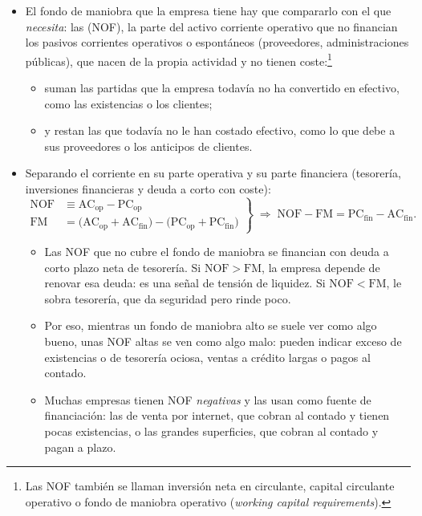 \documentclass[11pt]{article}
\begin{document}
\begin{itemize}
\item El fondo de maniobra que la empresa tiene hay que compararlo con el que \emph{necesita}: las  (NOF), la parte del activo corriente operativo que no financian los pasivos corrientes operativos o espontáneos (proveedores, administraciones públicas), que nacen de la propia actividad y no tienen coste:\footnote{Las NOF también se llaman inversión neta en circulante, capital circulante operativo o fondo de maniobra operativo (\emph{working capital requirements}).}
  \begin{itemize}
  \item suman las partidas que la empresa todavía no ha convertido en efectivo, como las existencias o los clientes;
  \item y restan las que todavía no le han costado efectivo, como lo que debe a sus proveedores o los anticipos de clientes.
  \end{itemize}
\item Separando el corriente en su parte operativa y su parte financiera (tesorería, inversiones financieras y deuda a corto con coste):
  \[
  \left.\begin{aligned}
  \mathrm{NOF}&\equiv\mathrm{AC}_{\mathrm{op}}-\mathrm{PC}_{\mathrm{op}}\\
  \mathrm{FM}&=\big(\mathrm{AC}_{\mathrm{op}}+\mathrm{AC}_{\mathrm{fin}}\big)-\big(\mathrm{PC}_{\mathrm{op}}+\mathrm{PC}_{\mathrm{fin}}\big)
  \end{aligned}\right\}
  \;\Longrightarrow\;
  \mathrm{NOF}-\mathrm{FM}=\mathrm{PC}_{\mathrm{fin}}-\mathrm{AC}_{\mathrm{fin}}.
  \]
  \begin{itemize}
  \item Las NOF que no cubre el fondo de maniobra se financian con deuda a corto plazo neta de tesorería. Si $\mathrm{NOF}>\mathrm{FM}$, la empresa depende de renovar esa deuda: es una señal de tensión de liquidez. Si $\mathrm{NOF}<\mathrm{FM}$, le sobra tesorería, que da seguridad pero rinde poco.
  \item Por eso, mientras un fondo de maniobra alto se suele ver como algo bueno, unas NOF altas se ven como algo malo: pueden indicar exceso de existencias o de tesorería ociosa, ventas a crédito largas o pagos al contado.
  \item Muchas empresas tienen NOF \emph{negativas} y las usan como fuente de financiación: las de venta por internet, que cobran al contado y tienen pocas existencias, o las grandes superficies, que cobran al contado y pagan a plazo.

\end{itemize}
\end{itemize}
\end{document}
